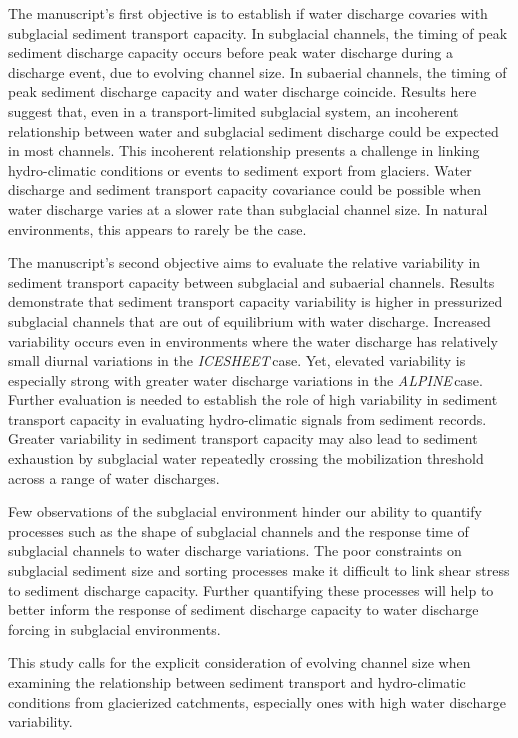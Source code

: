 \documentclass[tc, manuscript]{copernicus}
\newcommand{\alpine}{\textit{ALPINE}\,}
\newcommand{\icesheet}{\textit{ICESHEET}\,}
\begin{document}
The manuscript's first objective is to establish if water discharge covaries with subglacial sediment transport capacity.
In subglacial channels, the timing of peak sediment discharge capacity occurs before peak water discharge during a discharge event, due to evolving channel size.
In subaerial channels, the timing of peak sediment discharge capacity and water discharge coincide.
Results here suggest that, even in a transport-limited subglacial system, an incoherent relationship between water and subglacial sediment discharge could be expected in most channels.
This incoherent relationship presents a challenge in linking hydro-climatic conditions or events to sediment export from glaciers.
Water discharge and sediment transport capacity covariance could be possible when water discharge varies at a slower rate than subglacial channel size.
In natural environments, this appears to rarely be the case.

The manuscript's second objective aims to evaluate the relative variability in sediment transport capacity between subglacial and subaerial channels.
Results demonstrate that sediment transport capacity variability is higher in pressurized subglacial channels that are out of equilibrium with water discharge.
Increased variability occurs even in environments where the water discharge has relatively small diurnal variations in the \icesheet case.
Yet, elevated variability is especially strong with greater water discharge variations in the \alpine case.
Further evaluation is needed to establish the role of high variability in sediment transport capacity in evaluating hydro-climatic signals from sediment records.
Greater variability in sediment transport capacity may also lead to sediment exhaustion by subglacial water repeatedly crossing the mobilization threshold across a range of water discharges. 

Few observations of the subglacial environment hinder our ability to quantify processes such as
the shape of subglacial channels and the response time of subglacial channels to water discharge variations.
The poor constraints on subglacial sediment size and sorting processes make it difficult to link shear stress to sediment discharge capacity.
Further quantifying these processes will help to better inform the response of sediment discharge capacity to water discharge forcing in subglacial environments.

This study calls for the explicit consideration of evolving channel size when examining the relationship between sediment transport and hydro-climatic conditions from glacierized catchments, especially ones with high water discharge variability.
\end{document}
